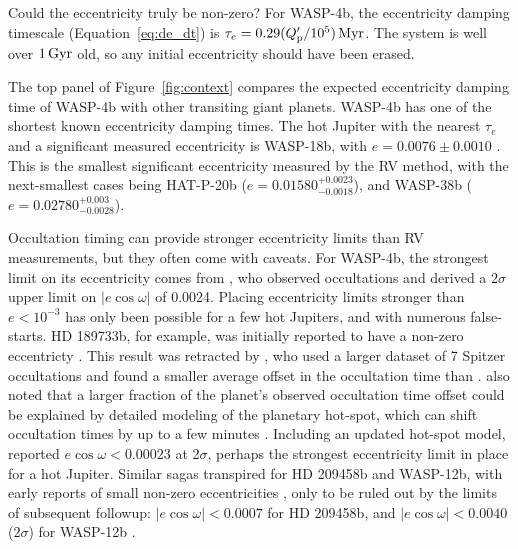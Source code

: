\documentclass[12pt,twocolumn,tighten]{aastex62}
\begin{document}
Could the eccentricity truly be non-zero?  For WASP-4b, the
eccentricity damping timescale (Equation~\ref{eq:de_dt}) is $\tau_e =
0.29 (Q_{\rm p}'/10^5) \, {\rm Myr}$.  The system is well over
$1\,{\rm Gyr}$ \citep{winn_transit_2009} old, so any initial
eccentricity should have been erased.

The top panel of Figure~\ref{fig:context} compares the expected
eccentricity damping time of WASP-4b with other transiting giant
planets.  WASP-4b has one of the shortest known eccentricity damping
times.  The hot Jupiter with the nearest $\tau_e$ and a significant
measured eccentricity is WASP-18b, with $e = 0.0076 \pm 0.0010$
\citep{triaud_spin-orbit_2010,bonomo_gaps_2017}.  This is the smallest
significant eccentricity measured by the RV method, with the
next-smallest cases being HAT-P-20b ($e =
0.01580^{+0.0023}_{-0.0018}$), and WASP-38b ($e =
0.02780^{+0.003}_{-0.0028}$).

Occultation timing can provide stronger eccentricity limits than RV
measurements, but they often come with caveats.  For WASP-4b, the
strongest limit on its eccentricity comes from
\citet{beerer_secondary_2011}, who observed occultations and derived a
$2\sigma$ upper limit on $| e\cos\omega | $ of 0.0024.
Placing eccentricity limits stronger than $e< 10^{-3}$ has only been
possible for a few hot Jupiters, and with numerous false-starts.
HD 189733b, for example, was initially reported to have a non-zero
eccentricty
\citep{knutson_map_2007}.  This result was retracted by
\citet{agol_climate_2010}, who used a larger dataset of 7 Spitzer
occultations and found a smaller average offset in the occultation
time than \citet{knutson_map_2007}.  \citet{agol_climate_2010} also
noted that a larger fraction of the planet's observed occultation time
offset could be explained by detailed modeling of the planetary
hot-spot, which can shift occultation times by up to a few minutes
\citep{williams_resolving_2006}.  Including an updated hot-spot model,
\citet{agol_climate_2010} reported $e\cos\omega < 0.00023$ at
2$\sigma$, perhaps the strongest eccentricity limit in place for a hot
Jupiter.  Similar sagas transpired for HD 209458b and WASP-12b, with
early reports of small non-zero eccentricities
\citep{winn_measurement_2005,hebb_wasp-12b_2009,lopez-morales_day-side_2010},
only to be ruled out by the limits of subsequent followup:
$|e\cos\omega| < 0.0007$ for HD 209458b, and $| e\cos\omega| < 0.0040$
($2\sigma$) for WASP-12b
\citep{crossfield_spitzer_mips_2012,campo_orbit_2011,croll_near-infrared_2011}.
\end{document}
